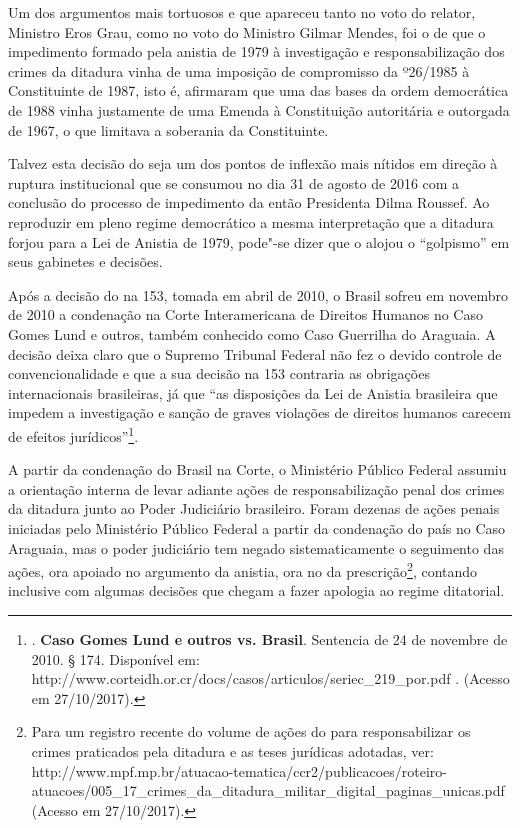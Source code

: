 Um dos argumentos mais tortuosos e que apareceu tanto no voto do
relator, Ministro Eros Grau, como no voto do Ministro Gilmar Mendes, foi
o de que o impedimento formado pela anistia de 1979 à investigação e
responsabilização dos crimes da ditadura vinha de uma imposição de
compromisso da  º26/1985 à Constituinte de 1987, isto é, afirmaram
que uma das bases da ordem democrática de 1988 vinha justamente de uma
Emenda à Constituição autoritária e outorgada de 1967, o que limitava a
soberania da Constituinte.

Talvez esta decisão do  seja um dos pontos de inflexão mais nítidos
em direção à ruptura institucional que se consumou no dia 31 de agosto
de 2016 com a conclusão do processo de impedimento da então Presidenta
Dilma Roussef. Ao reproduzir em pleno regime democrático a mesma
interpretação que a ditadura forjou para a Lei de Anistia de 1979,
pode"-se dizer que o  alojou o ``golpismo'' em seus gabinetes e
decisões.

Após a decisão do  na  153, tomada em abril de 2010, o Brasil
sofreu em novembro de 2010 a condenação na Corte Interamericana de
Direitos Humanos no Caso Gomes Lund e outros, também conhecido como Caso
Guerrilha do Araguaia. A decisão deixa claro que o Supremo Tribunal
Federal não fez o devido controle de convencionalidade e que a sua
decisão na  153 contraria as obrigações internacionais brasileiras,
já que ``as disposições da Lei de Anistia brasileira que impedem a
investigação e sanção de graves violações de direitos humanos carecem de
efeitos jurídicos''\footnote{.
  \textbf{Caso Gomes Lund e outros vs. Brasil}. Sentencia de 24 de
  novembre de 2010. § 174. Disponível em:
  http://www.corteidh.or.cr/docs/casos/articulos/seriec\_219\_por.pdf .
  (Acesso em 27/10/2017).}.

A partir da condenação do Brasil na Corte, o Ministério Público Federal
assumiu a orientação interna de levar adiante ações de responsabilização
penal dos crimes da ditadura junto ao Poder Judiciário brasileiro. Foram
dezenas de ações penais iniciadas pelo Ministério Público Federal a
partir da condenação do país no Caso Araguaia, mas o poder judiciário
tem negado sistematicamente o seguimento das ações, ora apoiado no
argumento da anistia, ora no da prescrição\footnote{Para um registro
  recente do volume de ações do  para responsabilizar os crimes
  praticados pela ditadura e as teses jurídicas adotadas, ver:
  http://www.mpf.mp.br/atuacao-tematica/ccr2/publicacoes/roteiro-atuacoes/005\_17\_crimes\_da\_ditadura\_militar\_digital\_paginas\_unicas.pdf
  (Acesso em 27/10/2017).}, contando inclusive com algumas decisões que
chegam a fazer apologia ao regime ditatorial.


